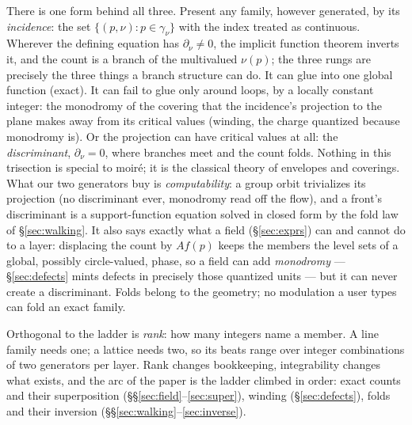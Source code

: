 There is one form behind all three. Present any family, however generated,
by its \emph{incidence}: the set $\{(p,\nu):p\in\gamma_\nu\}$ with the index
treated as continuous. Wherever the defining equation has
$\partial_\nu\neq0$, the implicit function theorem inverts it, and the count
is a branch of the multivalued $\nu(p)$; the three rungs are precisely the
three things a branch structure can do. It can glue into one global function
(exact). It can fail to glue only around loops, by a locally constant
integer: the monodromy of the covering that the incidence's projection to
the plane makes away from its critical values (winding, the charge quantized
because monodromy is). Or the projection can have critical values at all:
the \emph{discriminant}, $\partial_\nu=0$, where branches meet and the count
folds. Nothing in this trisection is special to moir\'e; it is the classical
theory of envelopes and coverings. What our two generators buy is
\emph{computability}: a group orbit trivializes its projection (no
discriminant ever, monodromy read off the flow), and a front's discriminant
is a support-function equation solved in closed form by the fold law of
\S\ref{sec:walking}. It also says exactly what a field
(\S\ref{sec:exprs}) can and cannot do to a layer: displacing the count by
$A f(p)$ keeps the members the level sets of a global, possibly
circle-valued, phase, so a field can add \emph{monodromy} ---
\S\ref{sec:defects} mints defects in precisely those quantized units --- but
it can never create a discriminant. Folds belong to the geometry; no
modulation a user types can fold an exact family.

Orthogonal to the ladder is \emph{rank}: how many integers name a member. A
line family needs one; a lattice needs two, so its beats range over integer
combinations of two generators per layer. Rank changes bookkeeping,
integrability changes what exists, and the arc of the paper is the ladder
climbed in order: exact counts and their superposition
(\S\S\ref{sec:field}--\ref{sec:super}), winding (\S\ref{sec:defects}), folds
and their inversion (\S\S\ref{sec:walking}--\ref{sec:inverse}).

